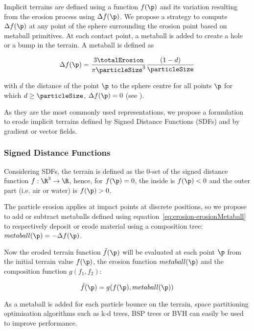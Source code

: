 Implicit terrains are defined using a function $f(\p)$ and its variation resulting from the erosion process using $\Delta f(\p)$.  
We propose a strategy to compute $\Delta f(\p)$ at any point of the sphere surrounding the erosion point based on metaball primitives. At each contact point, a metaball is added to create a hole or a bump in the terrain. A metaball is defined as 

\begin{align}
    \label{eq:erosion-erosionMetaball}
    \Delta f(\p) = \frac{3 \totalErosion}{\pi \particleSize^3} \frac{(1 - d)}{\particleSize}
\end{align}

with $d$ the distance of the point $\p$ to the sphere centre for all points $\p$ for which $d \geq \particleSize$, $\Delta f(\p) = 0$ (see ).

As they are the most commonly used representations, we propose a formulation to erode implicit terrains defined by Signed Distance Functions (SDFs) and by gradient or vector fields.

\subsubsection{Signed Distance Functions}
\label{sec:erosion-application_on_sdf}

Considering SDFs, the terrain is defined as the 0-set of the signed distance function $f: \R^3 \to \R$, hence, for $f(\p) = 0$, the inside is $f(\p) < 0$ and the outer part (i.e. air or water) is $f(\p) > 0$. 

The particle erosion applies at impact points at discrete positions, so we propose to add or subtract metaballs defined using equation~\eqref{eq:erosion-erosionMetaball} to respectively deposit or erode material using a composition tree:
 $metaball(\p) = -\Delta f(\p)$.

Now the eroded terrain function $\Tilde{f}(\p)$ will be evaluated at each point $\p$ from the initial terrain value $f(\p)$, the erosion function $metaball(\p)$ and the composition function $g(f_1, f_2)$:

\begin{align}
    \Tilde{f}(\p) = g(f(\p), metaball(\p)) \nonumber
\end{align}

As a metaball is added for each particle bounce on the terrain, space partitioning optimisation algorithms such as k-d trees, BSP trees or BVH can easily be used to improve performance.

